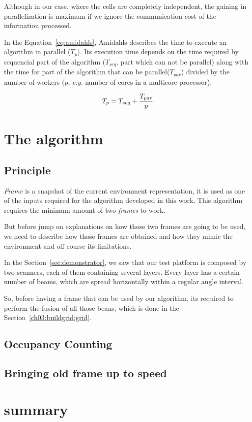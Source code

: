 Although in our case, where the cells are completely independent, the gaining in parallelization is maximum if we ignore the communication cost of the information processed.

In the Equation~\ref{eq:amidahls}, Amidahls describes the time to execute an algorithm in parallel ($T_p$). Its execution time depends on the time required by sequencial part of the algorithm ($T_{seq}$, part which can not be parallel) along with the time for part of the algorithm that can be parallel($T_{par}$) divided by the number of workers ($p$, \textit{e.g.} number of cores in a multicore processor).

\begin{equation}
\label{eq:amidahls}
T_p=T_{seq}+{T_{par} \over p}
\end{equation}

\section{The algorithm}

\subsection{Principle} 

\textit{Frame} is a snapshot of the current environment representation, it is used as one of the inputs required for the algorithm developed in this work. This algorithm requires the minimum amount of two \textit{frames} to work. 

But before jump on explanations on how those two frames are going to be used, we need to describe how those frames are obtained and how they mimic the environment and off course its limitations.

In the Section~\ref{sec:demonstrator}, we saw that our test platform is composed by two scanners, each of them containing several layers. Every layer has a certain number of beams, which are spread horizontally within a regular angle interval. 

So, before having a frame that can be used by our algorithm, its required to perform the fusion of all those beans, which is done in the Section~\ref{ch03:buildgrid:grid}. 

\subsection{Occupancy Counting} 

\subsection{Bringing old frame up to speed}


\section{summary}

